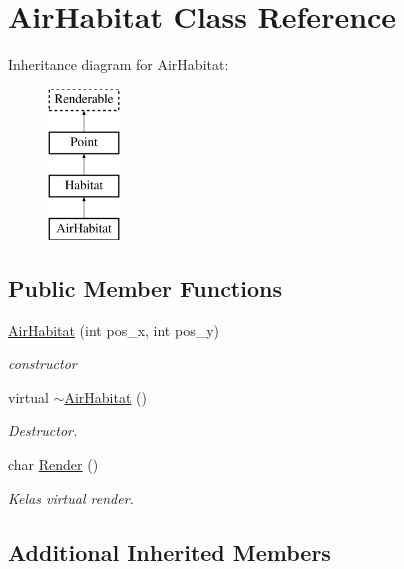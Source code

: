 \hypertarget{class_air_habitat}{}\section{Air\+Habitat Class Reference}
\label{class_air_habitat}
Inheritance diagram for Air\+Habitat\+:\begin{figure}[H]
\begin{center}
\leavevmode
\includegraphics[height=4.000000cm]{class_air_habitat}
\end{center}
\end{figure}
\subsection*{Public Member Functions}
\begin{DoxyCompactItemize}
\item 
\hyperlink{class_air_habitat_a4d4b615dfe33e65d01d84bc6406e8aab}{Air\+Habitat} (int pos\+\_\+x, int pos\+\_\+y)
\begin{DoxyCompactList}\small\item\em constructor \end{DoxyCompactList}\item 
virtual \hyperlink{class_air_habitat_a18f98f33d3edbb7c397e184f3b7ad56b}{$\sim$\+Air\+Habitat} ()\hypertarget{class_air_habitat_a18f98f33d3edbb7c397e184f3b7ad56b}{}\label{class_air_habitat_a18f98f33d3edbb7c397e184f3b7ad56b}

\begin{DoxyCompactList}\small\item\em Destructor. \end{DoxyCompactList}\item 
char \hyperlink{class_air_habitat_a6dd1a0d8235d9687874bb229099d40ff}{Render} ()
\begin{DoxyCompactList}\small\item\em Kelas virtual render. \end{DoxyCompactList}\end{DoxyCompactItemize}
\subsection*{Additional Inherited Members}


